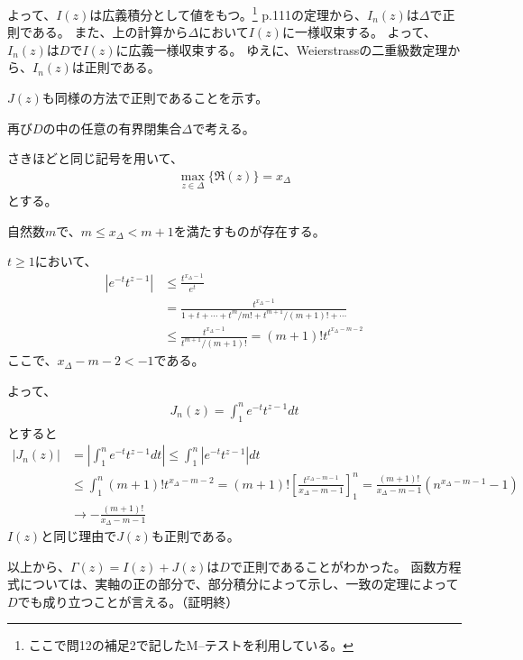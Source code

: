 よって、$I(z)$は広義積分として値をもつ。\footnote{ここで問12の補足2で記したM--テストを利用している。}
p.111の定理から、$I_n(z)$は$\Delta$で正則である。
また、上の計算から$\Delta$において$I(z)$に一様収束する。
よって、$I_n(z)$は$D$で$I(z)$に広義一様収束する。
ゆえに、Weierstrassの二重級数定理から、$I_n(z)$は正則である。

$J(z)$も同様の方法で正則であることを示す。

再び$D$の中の任意の有界閉集合$\Delta$で考える。

さきほどと同じ記号を用いて、
\begin{align*}
    \max_{z\in\Delta}\{\Re(z)\}=x_\Delta
\end{align*}
とする。

自然数$m$で、$m\le x_\Delta<m+1$を満たすものが存在する。

$t\ge1$において、
\begin{align*}
    |e^{-t}t^{z-1}|&\le\frac{t^{x_\Delta-1}}{e^t}\\
    &=\frac{t^{x_\Delta-1}}{1+t+\cdots+t^m/m!+t^{m+1}/(m+1)!+\cdots}\\
    &\le\frac{t^{x_\Delta-1}}{t^{m+1}/(m+1)!}
    =(m+1)!t^{t^{x_\Delta-m-2}}
\end{align*}
ここで、$x_\Delta-m-2<-1$である。

よって、
\begin{align*}
    J_n(z)=\int_{1}^{n}e^{-t}t^{z-1}dt
\end{align*}
とすると
\begin{align*}
    |J_n(z)|&=\left|\int_{1}^{n}e^{-t}t^{z-1}dt\right|
    \le\int_{1}^{n}|e^{-t}t^{z-1}|dt\\
    &\le\int_{1}^{n}(m+1)!t^{x_\Delta-m-2}
    =(m+1)!\left[\frac{t^{x_\Delta-m-1}}{x_\Delta-m-1}\right]_1^n
    =\frac{(m+1)!}{x_\Delta-m-1}(n^{x_\Delta-m-1}-1)\\
    &\longrightarrow-\frac{(m+1)!}{x_\Delta-m-1}
\end{align*}
$I(z)$と同じ理由で$J(z)$も正則である。

以上から、$\Gamma(z)=I(z)+J(z)$は$D$で正則であることがわかった。
函数方程式については、実軸の正の部分で、部分積分によって示し、一致の定理によって$D$でも成り立つことが言える。（証明終）
